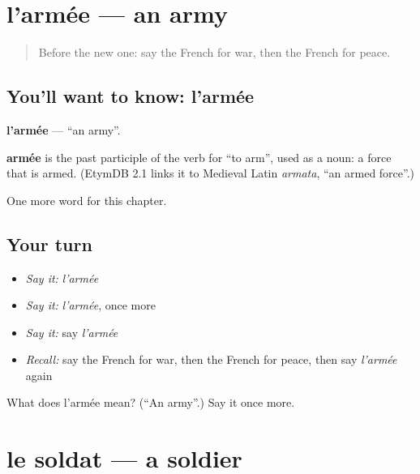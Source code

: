 \section[l'armée]{l'armée — an army}

\label{lesson:FR-C165-armee}



\begin{quote}
Before the new one: say the French for war, then the French for peace.
\end{quote}

\subsection*{You'll want to know: l'armée}
\textbf{l'armée} — \textquotedblleft{}an army\textquotedblright{}.

\begin{cousinweb}
\textbf{armée} is the past participle of the verb for \textquotedblleft{}to arm\textquotedblright{}, used as a noun: a force that is armed. (EtymDB 2.1 links it to Medieval Latin \emph{armata}, \textquotedblleft{}an armed force\textquotedblright{}.)
\end{cousinweb}

\begin{grammarlens}[title={What you've built}]
One more word for this chapter.
\end{grammarlens}

\subsection*{Your turn}
\begin{itemize}
\raggedright
  \item \emph{Say it:} \emph{l'armée}
  \item \emph{Say it:} \emph{l'armée}, once more
  \item \emph{Say it:} say \emph{l'armée}
  \item \emph{Recall:} say the French for war, then the French for peace, then say \emph{l'armée} again
\end{itemize}

\begin{tcolorbox}[breakable,colback=teal!4,colframe=teal!35!black,title={Before you move on}]
What does l'armée mean? (\textquotedblleft{}An army\textquotedblright{}.) Say it once more.
\end{tcolorbox}
\section[le soldat]{le soldat — a soldier}

